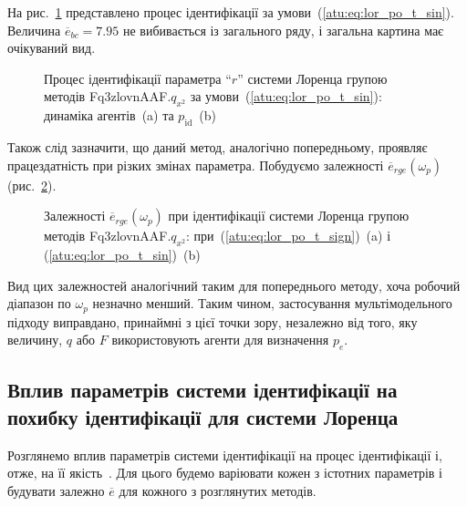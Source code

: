 На рис.~\ref{atu:f:lor_id_Fq3zlovnAAF.q_x2_sin} представлено процес ідентифікації за
умови~(\ref{atu:eq:lor_po_t_sin}). Величина
$\overline{e}_{bc} = 7.95$ не вибивається із загального ряду, і загальна
картина має очікуваний вид.

\begin{figure}[htb!]
  \caption{Процес ідентифікації параметра ``$r$'' системи Лоренца групою методів Fq3zlovnAAF.$q_{x^2} $ за умови~(\ref{atu:eq:lor_po_t_sin}): динаміка агентів~(a) та $p_\mathrm{id}$~(b)}
\label{atu:f:lor_id_Fq3zlovnAAF.q_x2_sin}
\end{figure}

Також слід зазначити, що даний метод, аналогічно попередньому,
проявляє працездатність при різких змінах параметра. Побудуємо
залежності
$\overline{e}_{rge}(\omega_p)$ (рис.~\ref{atu:f:lor_Fq3zlovnAAF_e_omega_p}).


\begin{figure}[htb!]
  \caption{Залежності $ \overline{e}_{rge} (\omega_p) $ при ідентифікації системи Лоренца групою методів Fq3zlovnAAF.$q_{x^2} $: при~(\ref{atu:eq:lor_po_t_sign})~(a) і (\ref{atu:eq:lor_po_t_sin})~(b)}
  \label{atu:f:lor_Fq3zlovnAAF_e_omega_p}
\end{figure}

Вид цих залежностей аналогічний таким для попереднього методу,
хоча робочий діапазон по
$\omega_p$ незначно менший. Таким чином, застосування мультімодельного
підходу виправдано, принаймні з цієї точки зору, незалежно
від того, яку величину,
$q$ або
$F$ використовують агенти для визначення
$p_e$.




\subsection{Вплив параметрів системи ідентифікації на похибку ідентифікації для системи Лоренца} %

Розглянемо вплив параметрів системи ідентифікації на процес
ідентифікації і, отже, на її якість~\cite{atu_ISDMCI2014}. Для цього будемо
варіювати кожен з істотних параметрів і будувати залежно
$\overline{e} $ для кожного з розглянутих методів.


